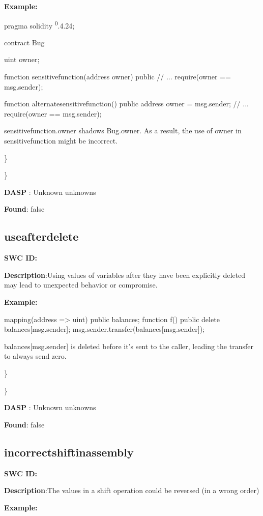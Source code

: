 \documentclass{article}
\begin{document}
\textbf{Example:} 

pragma solidity \textsuperscript0.4.24;

contract Bug {
    uint owner;

    function sensitive\textunderscore function(address owner) public {
        // ...
        require(owner == msg.sender);
    }

    function alternate\textunderscore sensitive\textunderscore function() public {
        address owner = msg.sender;
        // ...
        require(owner == msg.sender);
    }
}

sensitive\textunderscore function.owner shadows Bug.owner. As a result, the use of owner in sensitive\textunderscore function might be incorrect.

\} 

\} 

\textbf{DASP} : Unknown unknowns

\textbf{Found}: false

\subsection{use\textunderscore after\textunderscore delete} 
\textbf{SWC \textunderscore ID:} 

\textbf{Description}:Using values of variables after they have been explicitly deleted may lead to unexpected behavior or compromise.


\textbf{Example:} 

mapping(address => uint) public balances;
function f() public {
    delete balances[msg.sender];
    msg.sender.transfer(balances[msg.sender]);
}

balances[msg.sender] is deleted before it's sent to the caller, leading the transfer to always send zero.

\} 

\} 

\textbf{DASP} : Unknown unknowns

\textbf{Found}: false

\subsection{incorrect\textunderscore shift\textunderscore in\textunderscore assembly} 
\textbf{SWC \textunderscore ID:} 

\textbf{Description}:The values in a shift operation could be reversed (in a wrong order)


\textbf{Example:} 
\end{document}
